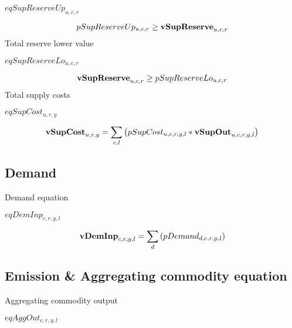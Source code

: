 \documentclass{article}
\begin{document}
$eqSupReserveUp_{u,c,r}$





\begin{dmath} 
pSupReserveUp_{u,c,r}  \ge  {\bf vSupReserve}_{u,c,r}
\end{dmath} 
Total reserve lower value







$eqSupReserveLo_{u,c,r}$





\begin{dmath} 
{\bf vSupReserve}_{u,c,r}  \ge  pSupReserveLo_{u,c,r}
\end{dmath} 
Total supply costs







$eqSupCost_{u,r,y}$





\begin{dmath} 
{\bf vSupCost}_{u,r,y}  =  \sum_{c,l}{\left(pSupCost_{u,c,r,y,l}*{\bf vSupOut}_{u,c,r,y,l}\right)}
\end{dmath} 
\subsection*{Demand}
Demand equation







$eqDemInp_{c,r,y,l}$





\begin{dmath} 
{\bf vDemInp}_{c,r,y,l}  =  \sum_{d}{\left(pDemand_{d,c,r,y,l}\right)}
\end{dmath} 
\subsection*{Emission \& Aggregating commodity equation}
Aggregating commodity output







$eqAggOut_{c,r,y,l}$
\end{document}
